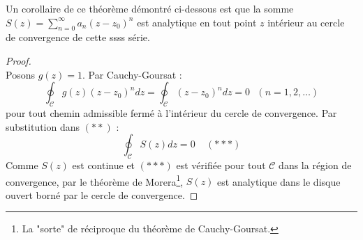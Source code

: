 	Un corollaire de ce théorème démontré ci-dessous est que la somme $S(z) = \sum_{n=0}^\infty 
	a_n (z-z_0)^n$ est analytique en tout point $z$ intérieur au cercle de convergence de cette ssss
	série.
	
	\begin{proof}\ \\
	Posons $g(z) = 1$. Par Cauchy-Goursat :
	\begin{equation}
	\oint_\mathcal{C}g(z)(z-z_0)^n dz = \oint_\mathcal{C}(z-z_0)^n dz = 0\ \ \ (n=1,2,\dots)
	\end{equation}
	pour tout chemin admissible fermé à l'intérieur du cercle de convergence. Par substitution 
	dans $(**)$ :
	\begin{equation}
	\oint_\mathcal{C} S(z)dz = 0\ \ \ \ \ (***)
	\end{equation}
	Comme $S(z)$ est continue et $(***)$ est vérifiée pour tout $\mathcal{C}$ dans la région 
	de convergence, par le théorème de Morera\footnote{La "sorte" de réciproque du théorème 
	de Cauchy-Goursat.}, $S(z)$ est analytique dans le disque ouvert borné par le cercle de 
	convergence.
	\end{proof}
	
	
	
